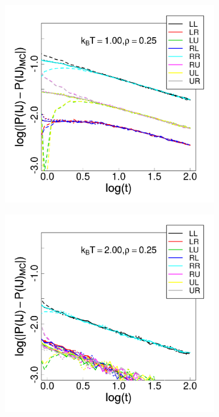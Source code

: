 \begin{figure}[h]
\centering
\begin{subfigure}[t]{0.45\textwidth}
	\centering
	\includegraphics[width=\textwidth]{Images/relax_1_25.png}
	\captionsetup{justification=centering, width=0.9\columnwidth}
\end{subfigure}
\begin{subfigure}[t]{0.45\textwidth}
	\centering
	\includegraphics[width=\textwidth]{Images/relax_2_25.png}

\end{subfigure}
\end{figure}
